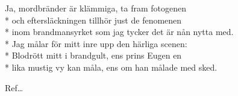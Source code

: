 \begin{SongText}[Härjarvisan]
\begin{SongVerse}
        Ja, mordbränder är klämmiga, ta fram fotogenen\\*%
        och eftersläckningen tillhör just de fenomenen\\*%
        inom brandmansyrket som jag tycker det är nån nytta med.\\*%
        Jag målar för mitt inre upp den härliga scenen:\\*%
        Blodrött mitt i brandgult, ens prins Eugen en\\*%
        lika mustig vy kan måla, ens om han målade med sked.
    \end{SongVerse}
    \begin{SongVerse}
        Ref…
    \end{SongVerse}
\end{SongText}
